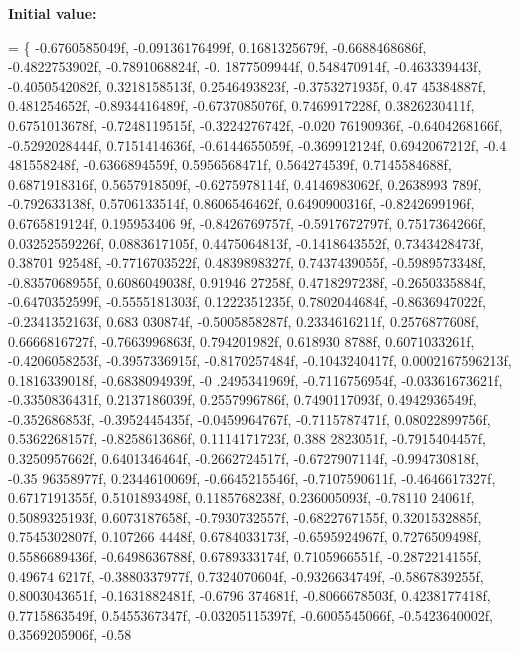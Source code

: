 {\bfseries Initial value\+:}
\begin{DoxyCode}
=
    \{
        -0.6760585049f, -0.09136176499f, 0.1681325679f, -0.6688468686f, -0.4822753902f, -0.7891068824f, -0.
      1877509944f, 0.548470914f, -0.463339443f, -0.4050542082f, 0.3218158513f, 0.2546493823f, -0.3753271935f, 0.47
      45384887f, 0.481254652f, -0.8934416489f,
        -0.6737085076f, 0.7469917228f, 0.3826230411f, 0.6751013678f, -0.7248119515f, -0.3224276742f, -0.020
      76190936f, -0.6404268166f, -0.5292028444f, 0.7151414636f, -0.6144655059f, -0.369912124f, 0.6942067212f, -0.4
      481558248f, -0.6366894559f, 0.5956568471f,
        0.564274539f, 0.7145584688f, 0.6871918316f, 0.5657918509f, -0.6275978114f, 0.4146983062f, 0.2638993
      789f, -0.792633138f, 0.5706133514f, 0.8606546462f, 0.6490900316f, -0.8242699196f, 0.6765819124f, 0.195953406
      9f, -0.8426769757f, -0.5917672797f,
        0.7517364266f, 0.03252559226f, 0.0883617105f, 0.4475064813f, -0.1418643552f, 0.7343428473f, 0.38701
      92548f, -0.7716703522f, 0.4839898327f, 0.7437439055f, -0.5989573348f, -0.8357068955f, 0.6086049038f, 0.91946
      27258f, 0.4718297238f, -0.2650335884f,
        -0.6470352599f, -0.5555181303f, 0.1222351235f, 0.7802044684f, -0.8636947022f, -0.2341352163f, 0.683
      030874f, -0.5005858287f, 0.2334616211f, 0.2576877608f, 0.6666816727f, -0.7663996863f, 0.794201982f, 0.618930
      8788f, 0.6071033261f, -0.4206058253f,
        -0.3957336915f, -0.8170257484f, -0.1043240417f, 0.0002167596213f, 0.1816339018f, -0.6838094939f, -0
      .2495341969f, -0.7116756954f, -0.03361673621f, -0.3350836431f, 0.2137186039f, 0.2557996786f, 0.7490117093f, 
      0.4942936549f, -0.352686853f, -0.3952445435f,
        -0.0459964767f, -0.7115787471f, 0.08022899756f, 0.5362268157f, -0.8258613686f, 0.1114171723f, 0.388
      2823051f, -0.7915404457f, 0.3250957662f, 0.6401346464f, -0.2662724517f, -0.6727907114f, -0.994730818f, -0.35
      96358977f, 0.2344610069f, -0.6645215546f,
        -0.7107590611f, -0.4646617327f, 0.6717191355f, 0.5101893498f, 0.1185768238f, 0.236005093f, -0.78110
      24061f, 0.5089325193f, 0.6073187658f, -0.7930732557f, -0.6822767155f, 0.3201532885f, 0.7545302807f, 0.107266
      4448f, 0.6784033173f, -0.6595924967f,
        0.7276509498f, 0.5586689436f, -0.6498636788f, 0.6789333174f, 0.7105966551f, -0.2872214155f, 0.49674
      6217f, -0.3880337977f, 0.7324070604f, -0.9326634749f, -0.5867839255f, 0.8003043651f, -0.1631882481f, -0.6796
      374681f, -0.8066678503f, 0.4238177418f,
        0.7715863549f, 0.5455367347f, -0.03205115397f, -0.6005545066f, -0.5423640002f, 0.3569205906f, -0.58

\end{DoxyCode}
